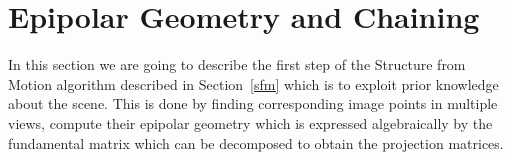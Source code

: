 \section{Epipolar Geometry and Chaining}
\label{egc}
In this section we are going to describe the first step of the Structure from Motion algorithm described in Section~\ref{sfm} which is to exploit prior knowledge about the scene. This is done by finding corresponding image points in multiple views, compute their epipolar geometry which is expressed algebraically by the fundamental matrix which can be decomposed to obtain the projection matrices.